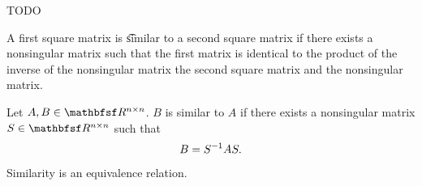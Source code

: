 

TODO


A first square matrix is \t{similar} to a second square matrix if there exists a nonsingular matrix such that the first matrix is identical to the product of the inverse of the nonsingular matrix the second square matrix and the nonsingular matrix.


Let $A, B \in \RMat{n}{n}$.
$B$ is similar to $A$ if there exists a nonsingular matrix $S \in \RMat{n}{n}$ such that
$$
  B = S^{-1}AS.
$$


\begin{prop}
  Similarity is an equivalence relation.
\end{prop}
